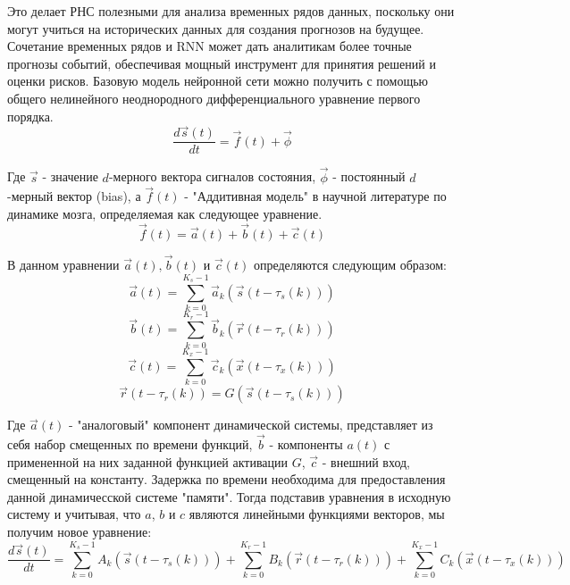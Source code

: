 \documentclass[12pt, a4paper]{article} %
\begin{document}
Это делает РНС полезными для анализа временных рядов данных, поскольку они могут учиться на исторических данных для создания прогнозов на будущее. Сочетание временных рядов и RNN может дать аналитикам более точные прогнозы событий, обеспечивая мощный инструмент для принятия решений и оценки рисков.
Базовую модель нейронной сети можно получить с помощью общего нелинейного неоднородного дифференциального уравнение первого порядка.
\begin{equation}
    \frac{d\vec{s}(t)}{dt}=\vec{f}(t)+\vec{\phi}
\end{equation}

Где $\vec{s}$ - значение $d$-мерного вектора сигналов состояния, $\vec{\phi}$ - постоянный $d$-мерный вектор (bias), а $\vec{f}(t)$ - "Аддитивная модель" в научной литературе по динамике мозга\cite{Saeid}, определяемая как следующее уравнение.
\begin{equation}
    \vec{f}(t) = \vec{a}(t) + \vec{b}(t) + \vec{c}(t)
\end{equation}

В данном уравнении $\vec{a}(t), \vec{b}(t)$ и $\vec{c}(t)$ определяются следующим образом:
\begin{equation}
    \vec{a}(t) = \sum_{k=0}^{K_s-1}\vec{a}_k (\vec{s}(t-\tau_s(k))) 
\end{equation}
\begin{equation}
    \vec{b}(t) = \sum_{k=0}^{K_r-1}\vec{b}_k (\vec{r}(t-\tau_r(k))) 
\end{equation}
\begin{equation}
    \vec{c}(t) = \sum_{k=0}^{K_x-1}\vec{c}_k (\vec{x}(t-\tau_x(k))) 
\end{equation}
\begin{equation}
    \vec{r}(t-\tau_r(k)) = G(\vec{s}(t-\tau_s(k)))
\end{equation}

Где $\vec{a}(t)$ - "аналоговый" компонент динамической системы, представляет из себя набор смещенных по времени функций, $\vec{b}$ - компоненты $a(t)$ с примененной на них заданной функцией активации $G$, $\vec{c}$ - внешний вход, смещенный на константу. Задержка по времени необходима для предоставления данной динамичесской системе "памяти".
Тогда подставив уравнения в исходную систему и учитывая, что $a$, $b$ и $c $ являются линейными функциями векторов, мы получим новое уравнение:
\begin{equation}
    \frac{d\vec{s}(t)}{dt}=\sum_{k=0}^{K_s-1}A_k(\vec{s}(t-\tau_s(k))) + \sum_{k=0}^{K_r-1}B_k (\vec{r}(t-\tau_r(k))) + \sum_{k=0}^{K_x-1}C_k (\vec{x}(t-\tau_x(k)))
\end{equation}
\end{document}
